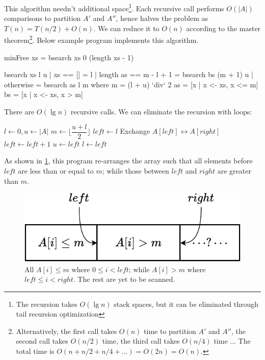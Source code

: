 \documentclass[b5paper]{article}
\begin{document}
This algorithm needn't additional space\footnote{The recursion takes $O(\lg n)$ stack spaces, but it can be eliminated through tail recursion optimization}. Each recursive call performs $O(|A|)$ comparisons to partition $A'$ and $A''$, hence halves the problem as $T(n) = T(n/2) + O(n)$. We can reduce it to $O(n)$ according to the master theorem\footnote{Alternatively, the first call takes $O(n)$ time to partition $A'$ and $A''$, the second call takes $O(n/2)$ time, the third call takes $O(n/4)$ time ... The total time is $O(n + n/2 + n/4 + ...) = O(2n) = O(n)$.}. Below example program implements this algorithm.

\lstset{frame = single}
\begin{Haskell}
minFree xs = bsearch xs 0 (length xs - 1)

bsearch xs l u | xs == [] = l
               | length as == m - l + 1 = bsearch bs (m + 1) u
               | otherwise = bsearch as l m
    where
      m = (l + u) `div` 2
      as = [x | x <- xs, x <= m]
      bs = [x | x <- xs, x > m]
\end{Haskell}

There are $O(\lg n)$ recursive calls. We can eliminate the recursion with loops:

\begin{algorithmic}[1]
  \State $l \gets 0, u \gets |A|$
    \State $m \gets \lfloor \dfrac{u + l}{2} \rfloor$
    \State $left \gets l$
        \State Exchange $A[left] \leftrightarrow A[right]$
        \State $left \gets left + 1$
      \EndIf
    \EndFor
      \State $u \gets left$
    \Else
      \State $l \gets left$
    \EndIf
  \EndWhile
\EndFunction
\end{algorithmic}

As shown in \cref{fig:divide}, this program re-arranges the array such that all elements before $left$ are less than or equal to $m$; while those between $left$ and $right$ are greater than $m$.

\begin{figure}[htbp]
  \centering
  \includegraphics[scale=0.7]{img/partition-by}
  \caption{All $A[i] \leq m$ where $0 \leq i < left$; while $A[i] > m$ where $left \leq i < right$. The rest are yet to be scanned.}
  \label{fig:divide}
\end{figure}
\end{document}
